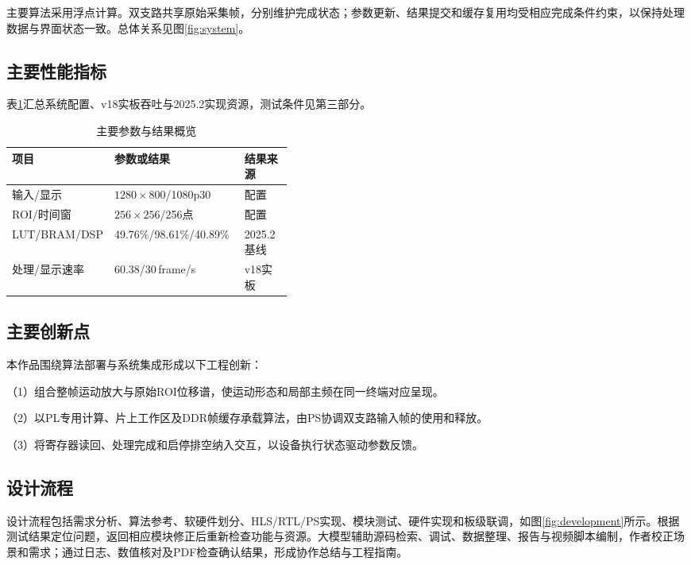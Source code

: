 主要算法采用浮点计算。双支路共享原始采集帧，分别维护完成状态；参数更新、结果提交和缓存复用均受相应完成条件约束，以保持处理数据与界面状态一致。总体关系见图\ref{fig:system}。

\subsection{主要性能指标}
表\ref{tab:overview-metrics}汇总系统配置、v18实板吞吐与2025.2实现资源，测试条件见第三部分。

\begin{table}[htbp]
  \centering\small
  \caption{主要参数与结果概览}
  \label{tab:overview-metrics}
  \begin{tabularx}{\linewidth}{@{}p{0.24\linewidth}Xp{0.17\linewidth}@{}}
    \toprule
    项目 & 参数或结果 & 结果来源 \\
    \midrule
    输入/显示 & $1280\times800$/1080p30 & 配置 \\
    ROI/时间窗 & $256\times256$/256点 & 配置 \\
    LUT/BRAM/DSP & 49.76\%/98.61\%/40.89\% & 2025.2基线 \\
    处理/显示速率 & 60.38/30\,frame/s & v18实板 \\
    \bottomrule
  \end{tabularx}
\end{table}

\subsection{主要创新点}
本作品围绕算法部署与系统集成形成以下工程创新：

（1）组合整帧运动放大与原始ROI位移谱，使运动形态和局部主频在同一终端对应呈现。

（2）以PL专用计算、片上工作区及DDR帧缓存承载算法，由PS协调双支路输入帧的使用和释放。

（3）将寄存器读回、处理完成和启停排空纳入交互，以设备执行状态驱动参数反馈。

\subsection{设计流程}
设计流程包括需求分析、算法参考、软硬件划分、HLS/RTL/PS实现、模块测试、硬件实现和板级联调，如图\ref{fig:development}所示。根据测试结果定位问题，返回相应模块修正后重新检查功能与资源。大模型辅助源码检索、调试、数据整理、报告与视频脚本编制，作者校正场景和需求；通过日志、数值核对及PDF检查确认结果，形成协作总结与工程指南。

